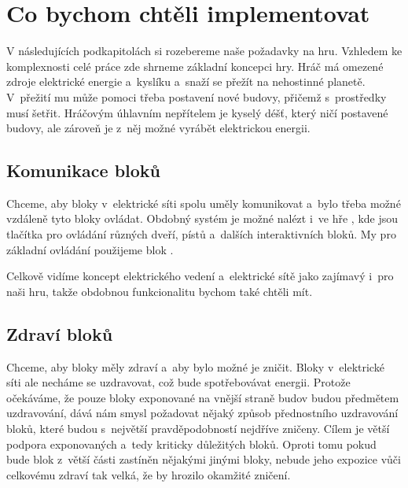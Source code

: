 


\section{Co bychom chtěli implementovat}
\label{sec:chceme}

V následujících podkapitolách si rozebereme naše požadavky na hru. Vzhledem ke komplexnosti celé práce zde shrneme základní koncepci hry. Hráč má omezené zdroje elektrické energie a~kyslíku a~snaží se přežít na nehostinné planetě. V~přežití mu může pomoci třeba postavení nové budovy, přičemž s~prostředky musí šetřit. Hráčovým úhlavním nepřítelem je kyselý déšť, který ničí postavené budovy, ale zároveň je z~něj možné vyrábět elektrickou energii. 







\subsection{Komunikace bloků}

Chceme, aby bloky v~elektrické síti spolu uměly komunikovat a~bylo třeba možné vzdáleně tyto bloky ovládat. Obdobný systém je možné nalézt i~ve hře \SE{}, kde jsou tlačítka pro ovládání různých dveří, pístů a~dalších interaktivních bloků. My pro základní ovládání použijeme blok .


Celkově vidíme koncept elektrického vedení a~elektrické sítě jako zajímavý i~pro naši hru, takže obdobnou funkcionalitu bychom také chtěli mít.



\subsection{Zdraví bloků}
Chceme, aby bloky měly zdraví a~aby bylo možné je zničit. Bloky v~elektrické síti ale necháme se uzdravovat, což bude spotřebovávat energii. Protože očekáváme, že pouze bloky exponované na vnější straně budov budou předmětem uzdravování, dává nám smysl požadovat nějaký způsob přednostního uzdravování bloků, které budou s~největší pravděpodobností nejdříve zničeny. Cílem je větší podpora exponovaných a~tedy kriticky důležitých bloků. Oproti tomu pokud bude blok z~větší části zastíněn nějakými jinými bloky, nebude jeho expozice vůči celkovému zdraví tak velká, že by hrozilo okamžité zničení.

